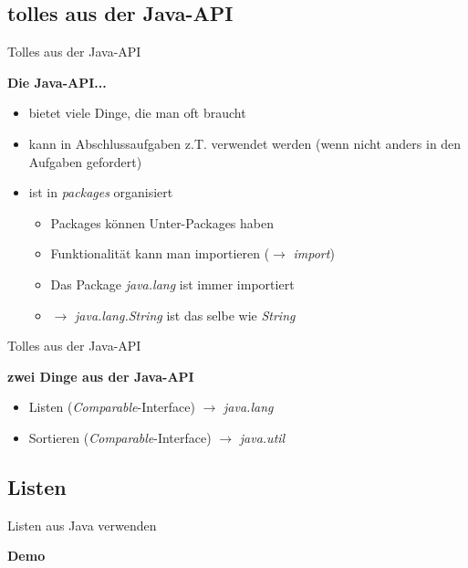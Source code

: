 \documentclass[18pt]{beamer}
\begin{document}
\subsection*{tolles aus der Java-API}

\begin{frame}{Tolles aus der Java-API}

	\textbf{Die Java-API...}
	\begin{itemize}
		\item bietet viele Dinge, die man oft braucht
		\item kann in Abschlussaufgaben z.T. verwendet werden (wenn nicht anders in den Aufgaben gefordert)
		\item ist in \emph{packages} organisiert\pause
		\begin{itemize}
			\item Packages können Unter-Packages haben
			\item Funktionalität kann man importieren ($\rightarrow$ \emph{import})\pause
			\item Das Package \emph{java.lang} ist immer importiert
			\item $\rightarrow$ \emph{java.lang.String} ist das selbe wie \emph{String}
		\end{itemize}
	\end{itemize}
\end{frame}


\begin{frame}{Tolles aus der Java-API}

	\textbf{zwei Dinge aus der Java-API}
	\begin{itemize}
		\item Listen (\emph{Comparable}-Interface) \pause $\rightarrow$ \emph{java.lang}\pause
		\item Sortieren (\emph{Comparable}-Interface) \pause $\rightarrow$ \emph{java.util}
	\end{itemize}
\end{frame}

\subsection*{Listen}
\begin{frame}{Listen aus Java verwenden}
	\begin{center}
		\begin{Huge}
			\textbf{Demo}
		\end{Huge}
	\end{center}
\end{frame}
\end{document}
